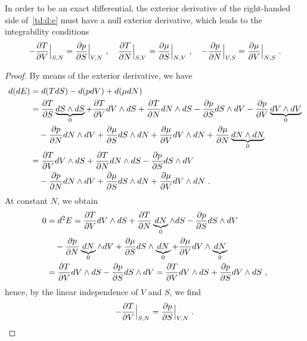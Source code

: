     In order to be an exact differential, the exterior derivative of the right-handed side of~\eqref{td:d:e} must have a null exterior derivative, which leads to the integrability conditions
    \begin{equation}\label{td:int:e}
        - \frac{\partial T}{\partial V} \Big \vert_{S,N} = \frac{\partial p}{\partial S} \Big \vert_{V,N} ~, \quad 
        \frac{\partial T}{\partial N} \Big \vert_{S,V} = \frac{\partial\mu}{\partial S} \Big \vert_{N, V} ~, \quad 
        - \frac{\partial p}{\partial N} \Big \vert_{V,S} = \frac{\partial\mu}{\partial V} \Big \vert_{N, S} ~. 
    \end{equation}
    \begin{proof}
        By means of the exterior derivative, we have 
        \begin{equation*}
        \begin{aligned}
            d (dE) & = d (T dS) - d (p dV) + d (\mu dN) \\ & = \frac{\partial T}{\partial S} \underbrace{dS \wedge dS}_0 + \frac{\partial T}{\partial V} dV \wedge dS + \frac{\partial T}{\partial N} dN \wedge dS - \frac{\partial p}{\partial S} dS \wedge dV - \frac{\partial p}{\partial V} \underbrace{dV \wedge dV}_0 \\ & \quad - \frac{\partial p}{\partial N} dN \wedge dV + \frac{\partial\mu}{\partial S} dS \wedge dN + \frac{\partial\mu}{\partial V} dV \wedge dN + \frac{\partial\mu}{\partial N} \underbrace{dN \wedge dN}_0 \\ & = \frac{\partial T}{\partial V} dV \wedge dS + \frac{\partial T}{\partial N} dN \wedge dS - \frac{\partial p}{\partial S} dS \wedge dV \\ & \quad - \frac{\partial p}{\partial N} dN \wedge dV + \frac{\partial\mu}{\partial S} dS \wedge dN + \frac{\partial\mu}{\partial V} dV \wedge dN ~.
        \end{aligned}
        \end{equation*}
        At constant $N$, we obtain
        \begin{equation*}
        \begin{aligned}
            0 & = d^2 E = \frac{\partial T}{\partial V} dV \wedge dS + \frac{\partial T}{\partial N} \underbrace{dN}_0 \wedge dS - \frac{\partial p}{\partial S} dS \wedge dV \\ & \quad - \frac{\partial p}{\partial N} \underbrace{dN}_0 \wedge dV + \frac{\partial\mu}{\partial S} dS \wedge \underbrace{dN}_0 + \frac{\partial\mu}{\partial V} dV \wedge \underbrace{dN}_0 \\ & = \frac{\partial T}{\partial V} dV \wedge dS - \frac{\partial p}{\partial S} dS \wedge dV = \frac{\partial T}{\partial V} dV \wedge dS + \frac{\partial p}{\partial S} dV \wedge dS ~,
        \end{aligned}
        \end{equation*}
        hence, by the linear independence of $V$ and $S$, we find
        \begin{equation*}
            - \frac{\partial T}{\partial V} \Big \vert_{S,N} = \frac{\partial p}{\partial S} \Big \vert_{V,N} ~.
        \end{equation*}

\end{proof}
